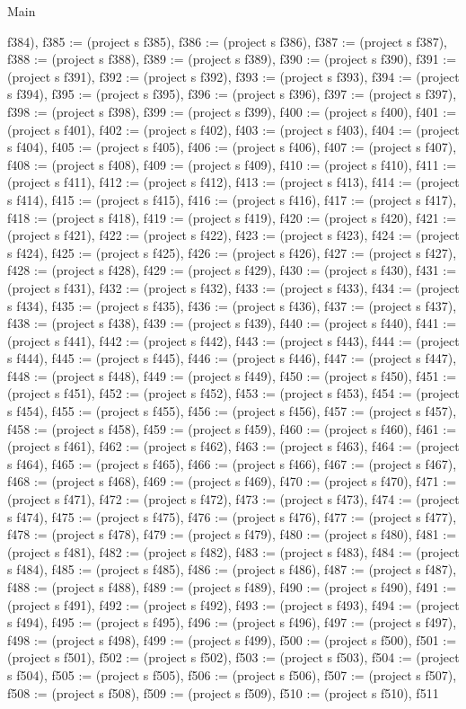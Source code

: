\begin{lexlean}{Main}
\begin{semanticmodule}
{f384), f385 := (project s f385), f386 := (project s f386), f387 := (project s f387), f388 := (project s f388), f389 := (project s f389), f390 := (project s f390), f391 := (project s f391), f392 := (project s f392), f393 := (project s f393), f394 := (project s f394), f395 := (project s f395), f396 := (project s f396), f397 := (project s f397), f398 := (project s f398), f399 := (project s f399), f400 := (project s f400), f401 := (project s f401), f402 := (project s f402), f403 := (project s f403), f404 := (project s f404), f405 := (project s f405), f406 := (project s f406), f407 := (project s f407), f408 := (project s f408), f409 := (project s f409), f410 := (project s f410), f411 := (project s f411), f412 := (project s f412), f413 := (project s f413), f414 := (project s f414), f415 := (project s f415), f416 := (project s f416), f417 := (project s f417), f418 := (project s f418), f419 := (project s f419), f420 := (project s f420), f421 := (project s f421), f422 := (project s f422), f423 := (project s f423), f424 := (project s f424), f425 := (project s f425), f426 := (project s f426), f427 := (project s f427), f428 := (project s f428), f429 := (project s f429), f430 := (project s f430), f431 := (project s f431), f432 := (project s f432), f433 := (project s f433), f434 := (project s f434), f435 := (project s f435), f436 := (project s f436), f437 := (project s f437), f438 := (project s f438), f439 := (project s f439), f440 := (project s f440), f441 := (project s f441), f442 := (project s f442), f443 := (project s f443), f444 := (project s f444), f445 := (project s f445), f446 := (project s f446), f447 := (project s f447), f448 := (project s f448), f449 := (project s f449), f450 := (project s f450), f451 := (project s f451), f452 := (project s f452), f453 := (project s f453), f454 := (project s f454), f455 := (project s f455), f456 := (project s f456), f457 := (project s f457), f458 := (project s f458), f459 := (project s f459), f460 := (project s f460), f461 := (project s f461), f462 := (project s f462), f463 := (project s f463), f464 := (project s f464), f465 := (project s f465), f466 := (project s f466), f467 := (project s f467), f468 := (project s f468), f469 := (project s f469), f470 := (project s f470), f471 := (project s f471), f472 := (project s f472), f473 := (project s f473), f474 := (project s f474), f475 := (project s f475), f476 := (project s f476), f477 := (project s f477), f478 := (project s f478), f479 := (project s f479), f480 := (project s f480), f481 := (project s f481), f482 := (project s f482), f483 := (project s f483), f484 := (project s f484), f485 := (project s f485), f486 := (project s f486), f487 := (project s f487), f488 := (project s f488), f489 := (project s f489), f490 := (project s f490), f491 := (project s f491), f492 := (project s f492), f493 := (project s f493), f494 := (project s f494), f495 := (project s f495), f496 := (project s f496), f497 := (project s f497), f498 := (project s f498), f499 := (project s f499), f500 := (project s f500), f501 := (project s f501), f502 := (project s f502), f503 := (project s f503), f504 := (project s f504), f505 := (project s f505), f506 := (project s f506), f507 := (project s f507), f508 := (project s f508), f509 := (project s f509), f510 := (project s f510), f511 }
\end{semanticmodule}
\end{lexlean}
